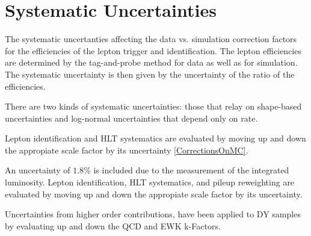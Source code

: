 \section{Systematic Uncertainties}

The systematic uncertanties affecting the data vs. simulation correction factors
for the efficiencies of the lepton trigger and identification. The lepton
efficiencies are determined by the tag-and-probe method \cite{tagandprobe} for data as well as for
simulation. The systematic uncertainty is then given by the uncertainty of
the ratio of the efficiencies.

There are two kinds of systematic uncertainties: those that relay on shape-based
uncertainties and log-normal uncertainties that depend only on rate.

Lepton identification and HLT systematics are evaluated by moving up and down
the appropiate scale factor by its uncertainty \ref{CorrectionsOnMC}.

An uncertainty of $1.8\%$ is included due to the measurement of
the integrated luminosity. Lepton identification, HLT systematics,
and pileup reweighting are evaluated by moving up and down the
appropiate scale factor by its uncertainty.

Uncertainties from higher order contributions, have been applied
to DY samples by evaluating up and down the QCD and EWK k-Factors.
